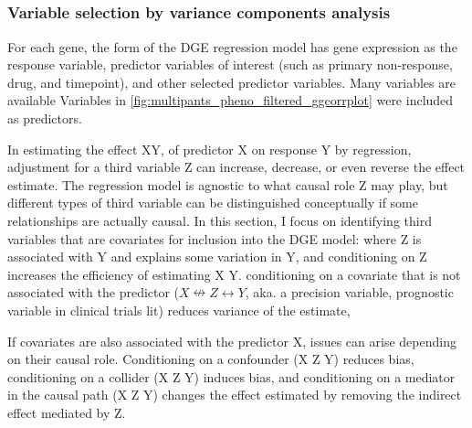 \begin{outline}
\subsection{}

\subsubsection{Variable selection by variance components analysis}
\label{subsubsec:multiPANTS_var_selection}

For each gene, the form of the \gls{DGE} regression model has gene expression as the response variable, 
predictor variables of interest (such as primary non-response, drug, and timepoint),
and other selected predictor variables.
Many variables are available 
Variables in \autoref{fig:multipants_pheno_filtered_ggcorrplot} were included as predictors.

\1 In estimating the effect X\textrightarrow Y, of predictor X on response Y by regression, 
adjustment for a third variable Z can increase, decrease, or even reverse the effect estimate.
The regression model is agnostic to what causal role Z may play,
but different types of third variable can be distinguished conceptually if some relationships are actually causal.
In this section, I focus on identifying third variables that are covariates for inclusion into the \gls{DGE} model:
where Z is associated with Y and explains some variation in Y,
and conditioning on Z increases the efficiency of estimating X \textrightarrow Y.
conditioning on a covariate that is not associated with the predictor ($X \nleftrightarrow Z \leftrightarrow Y$, aka. a precision variable, prognostic variable in clinical trials lit) reduces variance of the estimate,

\1 If covariates are also associated with the predictor X, issues can arise depending on their causal role.
Conditioning on a confounder (X \textleftarrow Z \textrightarrow Y) reduces bias,
conditioning on a collider (X \textrightarrow Z \textleftarrow Y) induces bias,
and conditioning on a mediator in the causal path (X \textrightarrow Z \textrightarrow Y) changes the effect estimated by removing the indirect effect mediated by Z.


\end{outline}
